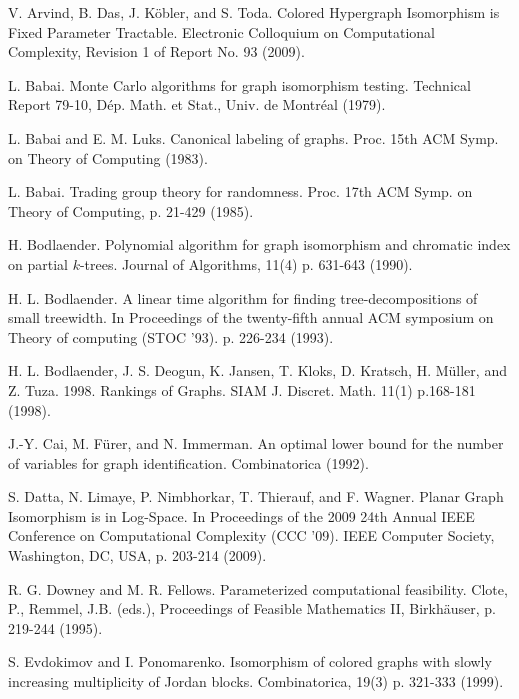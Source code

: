 \documentclass[11pt]{report}
\begin{document}
\begin{thebibliography}{9}


V. Arvind, B. Das, J. K\"obler, and S. Toda. Colored Hypergraph Isomorphism is Fixed
Parameter Tractable. Electronic Colloquium on Computational Complexity, Revision 1 of Report No. 93 (2009).

L. Babai. Monte Carlo algorithms for graph isomorphism testing. Technical Report 79-10, D\'ep. Math. et Stat., Univ. de Montr\'eal (1979).

 L. Babai and E. M. Luks. Canonical labeling of graphs. Proc. 15th ACM Symp. on Theory of Computing (1983).

 L. Babai.  Trading group theory for randomness. Proc. 17th ACM Symp. on Theory of Computing, p. 21-429 (1985).

H. Bodlaender. Polynomial algorithm for graph isomorphism and chromatic index on partial $k$-trees. Journal of Algorithms, 11(4) p. 631-643 (1990).

H. L. Bodlaender. A linear time algorithm for finding tree-decompositions of small treewidth. In Proceedings of the twenty-fifth annual ACM symposium on Theory of computing (STOC '93). p. 226-234 (1993).

H. L. Bodlaender, J. S. Deogun, K. Jansen, T. Kloks, D. Kratsch, H. M\"{u}ller, and Z. Tuza. 1998. Rankings of Graphs. SIAM J. Discret. Math. 11(1) p.168-181 (1998). 

J.-Y. Cai, M. F\"urer, and N. Immerman.  An optimal lower bound for the number of variables for graph identification. Combinatorica (1992).

S. Datta, N. Limaye, P. Nimbhorkar, T. Thierauf, and F. Wagner. Planar Graph Isomorphism is in Log-Space. In Proceedings of the 2009 24th Annual IEEE Conference on Computational Complexity (CCC '09). IEEE Computer Society, Washington, DC, USA, p. 203-214 (2009).

R. G. Downey and M. R. Fellows. Parameterized computational feasibility. Clote, P., Remmel, J.B. (eds.), Proceedings of Feasible Mathematics II, Birkh\"{a}user, p. 219-244 (1995).

S. Evdokimov and I. Ponomarenko. Isomorphism of colored graphs with slowly increasing multiplicity of Jordan blocks. Combinatorica, 19(3) p. 321-333 (1999).


\end{thebibliography}
\end{document}
